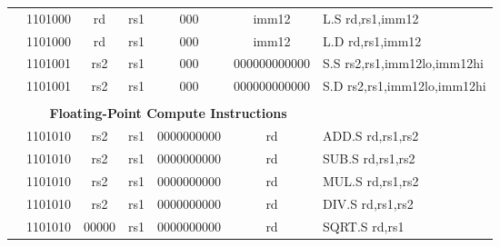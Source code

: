 \begin{table}[p]
\begin{small}
\begin{center}
\begin{tabular}{rcccccccccccl}
&
\multicolumn{2}{|c|}{1101000} &
\multicolumn{1}{c|}{rd} &
\multicolumn{1}{c|}{rs1} &
\multicolumn{2}{c|}{000} &
\multicolumn{5}{c|}{imm12} & L.S rd,rs1,imm12 \\
\cline{2-12}
  

&
\multicolumn{2}{|c|}{1101000} &
\multicolumn{1}{c|}{rd} &
\multicolumn{1}{c|}{rs1} &
\multicolumn{2}{c|}{000} &
\multicolumn{5}{c|}{imm12} & L.D rd,rs1,imm12 \\
\cline{2-12}
  

&
\multicolumn{2}{|c|}{1101001} &
\multicolumn{1}{c|}{rs2} &
\multicolumn{1}{c|}{rs1} &
\multicolumn{2}{c|}{000} &
\multicolumn{5}{c|}{000000000000} & S.S rs2,rs1,imm12lo,imm12hi \\
\cline{2-12}
  

&
\multicolumn{2}{|c|}{1101001} &
\multicolumn{1}{c|}{rs2} &
\multicolumn{1}{c|}{rs1} &
\multicolumn{2}{c|}{000} &
\multicolumn{5}{c|}{000000000000} & S.D rs2,rs1,imm12lo,imm12hi \\
\cline{2-12}
  

&
\multicolumn{11}{c}{} & \\
&
\multicolumn{11}{c}{\bf Floating-Point Compute Instructions} & \\
\cline{2-12}
  

&
\multicolumn{2}{|c|}{1101010} &
\multicolumn{1}{c|}{rs2} &
\multicolumn{1}{c|}{rs1} &
\multicolumn{6}{c|}{0000000000} &
\multicolumn{1}{c|}{rd} & ADD.S rd,rs1,rs2 \\
\cline{2-12}
  

&
\multicolumn{2}{|c|}{1101010} &
\multicolumn{1}{c|}{rs2} &
\multicolumn{1}{c|}{rs1} &
\multicolumn{6}{c|}{0000000000} &
\multicolumn{1}{c|}{rd} & SUB.S rd,rs1,rs2 \\
\cline{2-12}
  

&
\multicolumn{2}{|c|}{1101010} &
\multicolumn{1}{c|}{rs2} &
\multicolumn{1}{c|}{rs1} &
\multicolumn{6}{c|}{0000000000} &
\multicolumn{1}{c|}{rd} & MUL.S rd,rs1,rs2 \\
\cline{2-12}
  

&
\multicolumn{2}{|c|}{1101010} &
\multicolumn{1}{c|}{rs2} &
\multicolumn{1}{c|}{rs1} &
\multicolumn{6}{c|}{0000000000} &
\multicolumn{1}{c|}{rd} & DIV.S rd,rs1,rs2 \\
\cline{2-12}
  

&
\multicolumn{2}{|c|}{1101010} &
\multicolumn{1}{c|}{00000} &
\multicolumn{1}{c|}{rs1} &
\multicolumn{6}{c|}{0000000000} &
\multicolumn{1}{c|}{rd} & SQRT.S rd,rs1 \\
\cline{2-12}
  


\end{tabular}
\end{center}
\end{small}
\end{table}
